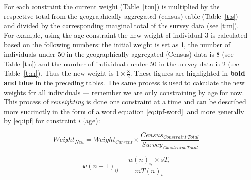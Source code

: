 \documentclass[a4paper, 11pt, twoside]{article}
\begin{document}
For each constraint the current weight (Table~\ref{t:m}) is multiplied by the respective
total from the geographically aggregated (census) table (Table~\ref{t:s}) and
divided by the corresponding marginal total of the survey data (see \cref{t:m}).
For example, using the age constraint the new weight of individual 3 is calculated
based on the following numbers: the initial weight is set as 1, the number of
individuals under 50 in the geographically aggregated (Census) data is 8 (see Table \ref{t:s})
and the number
of individuals under 50 in the survey data is 2 (see Table~\ref{t:m}). Thus the new weight is
$1 \times \frac{8}{2}$. These figures
are highlighted in \textbf{\color{blue}bold and blue} in the preceding tables.
The same process is used to calculate the new weights for all individuals --- remember
we are only constraining by age for now.
% 
% 
This process of \emph{reweighting} is done one constraint at a time and can
be described more succinctly in the form of a word equation
\cref{eq:ipf-word}, and more generally by \cref{eq:ipf} for constraint $i$ (age):

\begin{equation}
  Weight_{New} = Weight_{Current} \times \frac{Census_{Constraint \: Total}}{Survey_{Constraint \: Total}}
\label{eq:ipf-word}
\end{equation}

\begin{equation}
w(n+1)_{ij} = \frac{w(n)_{ij} \times sT_{i}}{mT(n)_{i}}
\label{eq:ipf}
\end{equation}
\end{document}
